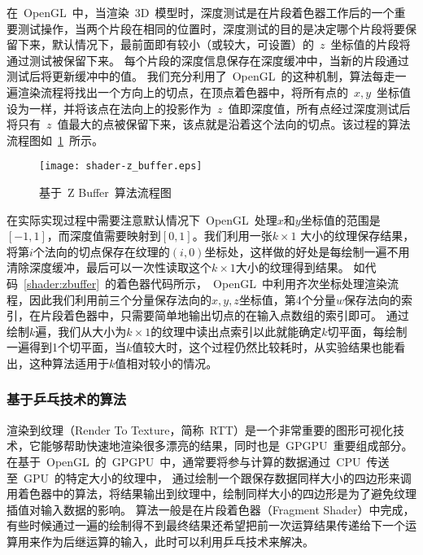 在~OpenGL~中，当渲染~3D~模型时，深度测试是在片段着色器工作后的一个重要测试操作，当两个片段在相同的位置时，深度测试的目的是决定哪个片段将要保留下来，默认情况下，最前面即有较小（或较大，可设置）的~$z$~坐标值的片段将通过测试被保留下来。
每个片段的深度信息保存在深度缓冲中，当新的片段通过测试后将更新缓冲中的值。
我们充分利用了~OpenGL~的这种机制，算法每走一遍渲染流程将找出一个方向上的切点，在顶点着色器中，将所有点的~$x,y$~坐标值设为一样，并将该点在法向上的投影作为~$z$~值即深度值，所有点经过深度测试后将只有~$z$~值最大的点被保留下来，该点就是沿着这个法向的切点。该过程的算法流程图如~\ref{fig:flowchart:zbuffer}~所示。

\begin{figure}[htbp]
  \centering
  \texttt{[image: shader-z\_buffer.eps]}
  \caption{基于~Z Buffer~算法流程图}
  \label{fig:flowchart:zbuffer}
\end{figure}

在实际实现过程中需要注意默认情况下~OpenGL~处理$x$和$y$坐标值的范围是$[-1,1]$，而深度值需要映射到$[0,1]$。我们利用一张$k \times 1$ 大小的纹理保存结果，将第$i$个法向的切点保存在纹理的$(i,0)$坐标处，这样做的好处是每绘制一遍不用清除深度缓冲，最后可以一次性读取这个$k \times 1$大小的纹理得到结果。
如代码~\ref{shader:zbuffer}~的着色器代码所示，~OpenGL~中利用齐次坐标处理渲染流程，因此我们利用前三个分量保存法向的$x,y,z$坐标值，第4个分量$w$保存法向的索引，在片段着色器中，只需要简单地输出切点的在输入点数组的索引即可。
通过绘制$k$遍，我们从大小为$k \times 1$的纹理中读出点索引以此就能确定$k$切平面，每绘制一遍得到1个切平面，当$k$值较大时，这个过程仍然比较耗时，从实验结果也能看出，这种算法适用于$k$值相对较小的情况。

%


%


\subsubsection{基于乒乓技术的算法}

渲染到纹理（Render To Texture，简称~RTT）是一个非常重要的图形可视化技术，它能够帮助快速地渲染很多漂亮的结果，同时也是~GPGPU~重要组成部分。在基于~OpenGL~的~GPGPU~中，通常要将参与计算的数据通过~CPU~传送至~GPU~的特定大小的纹理中，
通过绘制一个跟保存数据同样大小的四边形来调用着色器中的算法\cite{gpgpuqiu}，将结果输出到纹理中，绘制同样大小的四边形是为了避免纹理插值对输入数据的影响。
算法一般是在片段着色器（Fragment Shader）中完成，有些时候通过一遍的绘制得不到最终结果还希望把前一次运算结果传递给下一个运算用来作为后继运算的输入，此时可以利用乒乓技术来解决。

